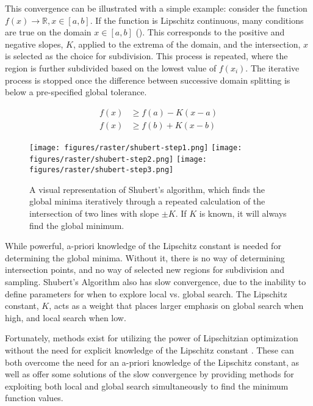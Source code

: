 This convergence can be illustrated with a simple example: consider the function $f(x) \rightarrow \mathbb{R}, x \in [a,b]$.
If the function is Lipschitz continuous, many conditions are true on the domain $x\in[a,b]$ ().
This corresponds to the positive and negative slopes, $K$, applied to the extrema of the domain, and the intersection, $x$ is selected as the choice for subdivision.
This process is repeated, where the region is further subdivided based on the lowest value of $f(x_i)$.
The iterative process is stopped once the difference between successive domain splitting is below a pre-specified global tolerance.

\begin{equation}
    \begin{aligned}
        f(x) &\ge f(a) - K(x - a) \\
        f(x) &\ge f(b) + K(x - b)
    \end{aligned}
    \label{eq:shubert}
\end{equation}

\begin{figure}
    \begin{center}
        \texttt{[image: figures/raster/shubert-step1.png]}
        \vspace{3mm}
        \texttt{[image: figures/raster/shubert-step2.png]}
        \vspace{3mm}
        \texttt{[image: figures/raster/shubert-step3.png]}
    \end{center}
    \label{fig:shubert}
    \caption{A visual representation of Shubert's algorithm, which finds the global minima iteratively through a repeated calculation of the intersection of two lines with slope $\pm K$. If $K$ is known, it will always find the global minimum.}
\end{figure}

While powerful, a-priori knowledge of the Lipschitz constant is needed for determining the global minima.
Without it, there is no way of determining intersection points, and no way of selected new regions for subdivision and sampling.
Shubert's Algorithm also has slow convergence, due to the inability to define parameters for when to explore local vs. global search.
The Lipschitz constant, $K$, acts as a weight that places larger emphasis on global search when high, and local search when low.

Fortunately, methods exist for utilizing the power of Lipschitzian optimization without the need for explicit knowledge of the Lipschitz constant \cite{jonesLipschitzianOptimizationLipschitz1993,stripinisNewDIRECTGLhAlgorithm2021,stripinisDGONewDIRECTtype2021}.
These can both overcome the need for an a-priori knowledge of the Lipschitz constant, as well as offer some solutions of the slow convergence by providing methods for exploiting both local and global search simultaneously to find the minimum function values.


